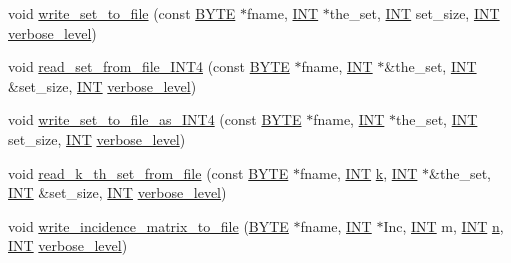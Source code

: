 \begin{DoxyCompactItemize}
\item 
void \mbox{\hyperlink{util_8_c_a3d2767f53fed9a2dacf580e0b2d4b961}{write\+\_\+set\+\_\+to\+\_\+file}} (const \mbox{\hyperlink{galois_8h_ab6cc7b4aeb6ea31aba2b3fbfc83ff5e6}{B\+Y\+TE}} $\ast$fname, \mbox{\hyperlink{galois_8h_a09fddde158a3a20bd2dcadb609de11dc}{I\+NT}} $\ast$the\+\_\+set, \mbox{\hyperlink{galois_8h_a09fddde158a3a20bd2dcadb609de11dc}{I\+NT}} set\+\_\+size, \mbox{\hyperlink{galois_8h_a09fddde158a3a20bd2dcadb609de11dc}{I\+NT}} \mbox{\hyperlink{simeon_8_c_a818073fbcc2f439e7c56952f67386122}{verbose\+\_\+level}})
\item 
void \mbox{\hyperlink{util_8_c_a8638b609d7f95a4c08badffea650829a}{read\+\_\+set\+\_\+from\+\_\+file\+\_\+\+I\+N\+T4}} (const \mbox{\hyperlink{galois_8h_ab6cc7b4aeb6ea31aba2b3fbfc83ff5e6}{B\+Y\+TE}} $\ast$fname, \mbox{\hyperlink{galois_8h_a09fddde158a3a20bd2dcadb609de11dc}{I\+NT}} $\ast$\&the\+\_\+set, \mbox{\hyperlink{galois_8h_a09fddde158a3a20bd2dcadb609de11dc}{I\+NT}} \&set\+\_\+size, \mbox{\hyperlink{galois_8h_a09fddde158a3a20bd2dcadb609de11dc}{I\+NT}} \mbox{\hyperlink{simeon_8_c_a818073fbcc2f439e7c56952f67386122}{verbose\+\_\+level}})
\item 
void \mbox{\hyperlink{util_8_c_ad354043faa0d816b08db1bbd68c250cd}{write\+\_\+set\+\_\+to\+\_\+file\+\_\+as\+\_\+\+I\+N\+T4}} (const \mbox{\hyperlink{galois_8h_ab6cc7b4aeb6ea31aba2b3fbfc83ff5e6}{B\+Y\+TE}} $\ast$fname, \mbox{\hyperlink{galois_8h_a09fddde158a3a20bd2dcadb609de11dc}{I\+NT}} $\ast$the\+\_\+set, \mbox{\hyperlink{galois_8h_a09fddde158a3a20bd2dcadb609de11dc}{I\+NT}} set\+\_\+size, \mbox{\hyperlink{galois_8h_a09fddde158a3a20bd2dcadb609de11dc}{I\+NT}} \mbox{\hyperlink{simeon_8_c_a818073fbcc2f439e7c56952f67386122}{verbose\+\_\+level}})
\item 
void \mbox{\hyperlink{util_8_c_aad3a1f5b1aaa9d7fa8b290fc1f8e259f}{read\+\_\+k\+\_\+th\+\_\+set\+\_\+from\+\_\+file}} (const \mbox{\hyperlink{galois_8h_ab6cc7b4aeb6ea31aba2b3fbfc83ff5e6}{B\+Y\+TE}} $\ast$fname, \mbox{\hyperlink{galois_8h_a09fddde158a3a20bd2dcadb609de11dc}{I\+NT}} \mbox{\hyperlink{simeon_8_c_a43fa990200c3ddd47c35f151bd4d66bf}{k}}, \mbox{\hyperlink{galois_8h_a09fddde158a3a20bd2dcadb609de11dc}{I\+NT}} $\ast$\&the\+\_\+set, \mbox{\hyperlink{galois_8h_a09fddde158a3a20bd2dcadb609de11dc}{I\+NT}} \&set\+\_\+size, \mbox{\hyperlink{galois_8h_a09fddde158a3a20bd2dcadb609de11dc}{I\+NT}} \mbox{\hyperlink{simeon_8_c_a818073fbcc2f439e7c56952f67386122}{verbose\+\_\+level}})
\item 
void \mbox{\hyperlink{util_8_c_a1883a8e4806f552ace65d33cbed63bc6}{write\+\_\+incidence\+\_\+matrix\+\_\+to\+\_\+file}} (\mbox{\hyperlink{galois_8h_ab6cc7b4aeb6ea31aba2b3fbfc83ff5e6}{B\+Y\+TE}} $\ast$fname, \mbox{\hyperlink{galois_8h_a09fddde158a3a20bd2dcadb609de11dc}{I\+NT}} $\ast$Inc, \mbox{\hyperlink{galois_8h_a09fddde158a3a20bd2dcadb609de11dc}{I\+NT}} m, \mbox{\hyperlink{galois_8h_a09fddde158a3a20bd2dcadb609de11dc}{I\+NT}} \mbox{\hyperlink{simeon_8_c_a7f2cd26777ce0ff3fdaf8d02aacbddfb}{n}}, \mbox{\hyperlink{galois_8h_a09fddde158a3a20bd2dcadb609de11dc}{I\+NT}} \mbox{\hyperlink{simeon_8_c_a818073fbcc2f439e7c56952f67386122}{verbose\+\_\+level}})

\end{DoxyCompactItemize}
